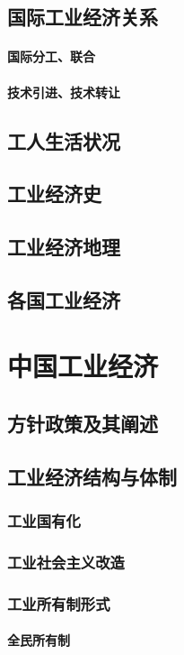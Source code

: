 \documentclass[UTF8]{../../RepresentationUniverse}
\begin{document}
\section{国际工业经济关系}
    \subsubsection{国际分工、联合}
    \subsubsection{技术引进、技术转让}

\section{工人生活状况}
\section{工业经济史}
\section{工业经济地理}
\section{各国工业经济}

 


\chapter{中国工业经济}
\section{方针政策及其阐述}
\section{工业经济结构与体制}
    \subsection{工业国有化}
    \subsection{工业社会主义改造}
    \subsection{工业所有制形式}
        \subsubsection{全民所有制}
\end{document}
